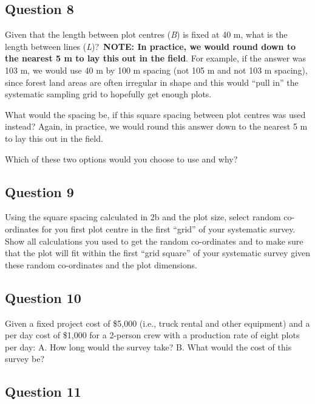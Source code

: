 \documentclass[
  letterpaper,
]{book}
\begin{document}
\hypertarget{question-8-2}{%
\subsection*{Question 8}\label{question-8-2}}

Given that the length between plot centres (\emph{B}) is fixed at 40 m,
what is the length between lines (\emph{L})?~\textbf{NOTE: In practice,
we would round down to the nearest 5 m to lay this out in the field}.
For example, if the answer was 103 m, we would use 40 m by 100 m spacing
(not 105 m and not 103 m spacing), since forest land areas are often
irregular in shape and this would ``pull in'' the systematic sampling
grid to hopefully get enough plots.

What would the spacing be, if this square spacing between plot centres
was used instead? Again, in practice, we would round this answer down to
the nearest 5 m to lay this out in the field.

Which of these two options would you choose to use and why?

\hypertarget{question-9-2}{%
\subsection*{Question 9}\label{question-9-2}}

Using the square spacing calculated in 2b and the plot size, select
random co-ordinates for you first plot centre in the first ``grid'' of
your systematic survey. Show all calculations you used to get the random
co-ordinates and to make sure that the plot will fit within the first
``grid square'' of your systematic survey given these random
co-ordinates and the plot dimensions.

\hypertarget{question-10-2}{%
\subsection*{Question 10}\label{question-10-2}}

Given a fixed project cost of \$5,000 (i.e., truck rental and other
equipment) and a per day cost of \$1,000 for a 2-person crew with a
production rate of eight plots per day: A. How long would the survey
take? B. What would the cost of this survey be?

\hypertarget{question-11-2}{%
\subsection*{Question 11}\label{question-11-2}}
\end{document}
